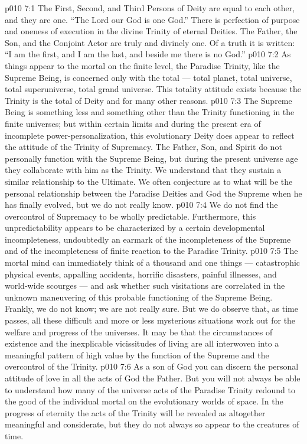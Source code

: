 \vs p010 7:1 The First, Second, and Third Persons of Deity are equal to each other, and they are one. “The Lord our God is one God.” There is perfection of purpose and oneness of execution in the divine Trinity of eternal Deities. The Father, the Son, and the Conjoint Actor are truly and divinely one. Of a truth it is written: “I am the first, and I am the last, and beside me there is no God.”
\vs p010 7:2 \pc As things appear to the mortal on the finite level, the Paradise Trinity, like the Supreme Being, is concerned only with the total --- total planet, total universe, total superuniverse, total grand universe. This totality attitude exists because the Trinity is the total of Deity and for many other reasons.
\vs p010 7:3 The Supreme Being is something less and something other than the Trinity functioning in the finite universes; but within certain limits and during the present era of incomplete power\hyp{}personalization, this evolutionary Deity does appear to reflect the attitude of the Trinity of Supremacy. The Father, Son, and Spirit do not personally function with the Supreme Being, but during the present universe age they collaborate with him as the Trinity. We understand that they sustain a similar relationship to the Ultimate. We often conjecture as to what will be the personal relationship between the Paradise Deities and God the Supreme when he has finally evolved, but we do not really know.
\vs p010 7:4 \pc We do not find the overcontrol of Supremacy to be wholly predictable. Furthermore, this unpredictability appears to be characterized by a certain developmental incompleteness, undoubtedly an earmark of the incompleteness of the Supreme and of the incompleteness of finite reaction to the Paradise Trinity.
\vs p010 7:5 The mortal mind can immediately think of a thousand and one things --- catastrophic physical events, appalling accidents, horrific disasters, painful illnesses, and world\hyp{}wide scourges --- and ask whether such visitations are correlated in the unknown maneuvering of this probable functioning of the Supreme Being. Frankly, we do not know; we are not really sure. But we do observe that, as time passes, all these difficult and more or less mysterious situations  work out for the welfare and progress of the universes. It may be that the circumstances of existence and the inexplicable vicissitudes of living are all interwoven into a meaningful pattern of high value by the function of the Supreme and the overcontrol of the Trinity.
\vs p010 7:6 As a son of God you can discern the personal attitude of love in all the acts of God the Father. But you will not always be able to understand how many of the universe acts of the Paradise Trinity redound to the good of the individual mortal on the evolutionary worlds of space. In the progress of eternity the acts of the Trinity will be revealed as altogether meaningful and considerate, but they do not always so appear to the creatures of time.
